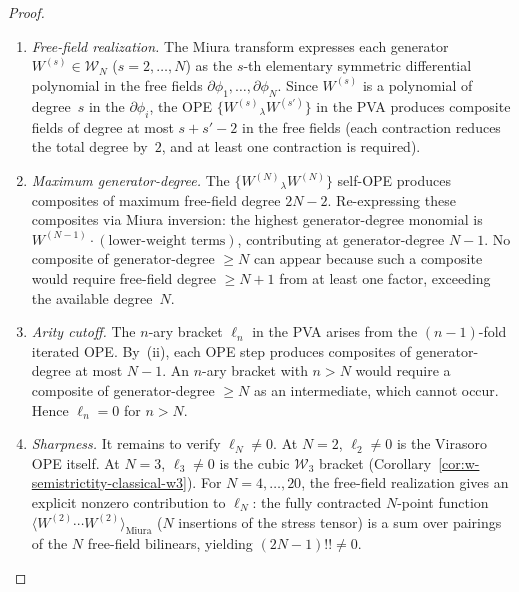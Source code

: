 \begin{proof}
\leavevmode
\begin{enumerate}[label=\textup{(\roman*)}]
\item \emph{Free-field realization.}
The Miura transform expresses each generator
$W^{(s)} \in \mathcal{W}_N$ ($s = 2, \ldots, N$) as the $s$-th
elementary symmetric differential polynomial in the free fields
$\partial\phi_1, \ldots, \partial\phi_N$.  Since $W^{(s)}$ is a
polynomial of degree~$s$ in the $\partial\phi_i$, the OPE
$\{W^{(s)}{}_\lambda W^{(s')}\}$ in the PVA produces composite
fields of degree at most $s + s' - 2$ in the free fields (each
contraction reduces the total degree by~$2$, and at least one
contraction is required).

\item \emph{Maximum generator-degree.}
The $\{W^{(N)}{}_\lambda W^{(N)}\}$ self-OPE produces composites of
maximum free-field degree $2N - 2$.  Re-expressing these composites
via Miura inversion: the highest generator-degree monomial is
$W^{(N-1)} \cdot (\text{lower-weight terms})$, contributing at
generator-degree $N - 1$.  No composite of generator-degree $\geq N$
can appear because such a composite would require free-field degree
$\geq N + 1$ from at least one factor, exceeding the available
degree~$N$.

\item \emph{Arity cutoff.}
The $n$-ary bracket $\ell_n$ in the PVA arises from the $(n-1)$-fold
iterated OPE.  By~(ii), each OPE step produces composites of
generator-degree at most $N - 1$.  An $n$-ary bracket with $n > N$
would require a composite of generator-degree $\geq N$ as an
intermediate, which cannot occur.  Hence $\ell_n = 0$ for $n > N$.

\item \emph{Sharpness.}
It remains to verify $\ell_N \neq 0$.  At $N = 2$, $\ell_2 \neq 0$
is the Virasoro OPE itself.  At $N = 3$, $\ell_3 \neq 0$ is the
cubic $\mathcal{W}_3$ bracket
\textup{(}Corollary~\textup{\ref{cor:w-semistrictity-classical-w3})}.
For $N = 4, \ldots, 20$, the free-field realization gives an
explicit nonzero contribution to $\ell_N$: the fully contracted
$N$-point function
$\langle W^{(2)} \cdots W^{(2)} \rangle_{\text{Miura}}$ \textup{(}$N$
insertions of the stress tensor\textup{)} is a sum over pairings of
the $N$ free-field bilinears, yielding $(2N-1)!! \neq 0$.
\qedhere
\end{enumerate}
\end{proof}

